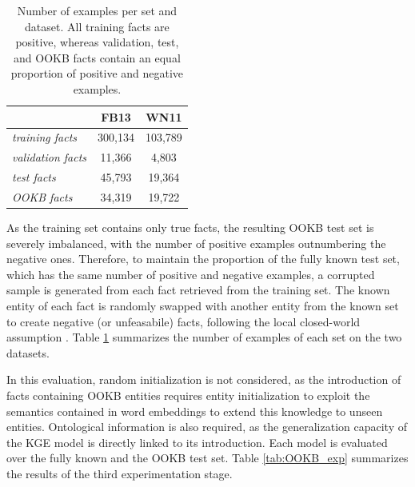\begin{table} 
\centering
\begin{tabular}{l|c|c|}
\cline{2-3}
\textit{}                                       & FB13    & WN11    \\ \hline
\multicolumn{1}{|l|}{\textit{training facts}}   & 300,134 & 103,789 \\ \hline
\multicolumn{1}{|l|}{\textit{validation facts}} & 11,366  & 4,803   \\ \hline
\multicolumn{1}{|l|}{\textit{test facts}}       & 45,793  & 19,364  \\ \hline
\multicolumn{1}{|l|}{\textit{OOKB facts}}      & 34,319  & 19,722  \\ \hline
\end{tabular}
\caption{Number of examples per set and dataset. All training facts are positive, whereas validation, test, and OOKB facts contain an equal proportion of positive and negative examples.}
\label{tab:OOKB_proportions}
\end{table}

As the training set contains only true facts, the resulting OOKB test set is severely imbalanced, with the number of positive examples outnumbering the negative ones. Therefore, to maintain the proportion of the fully known test set, which has the same number of positive and negative examples, a corrupted sample is generated from each fact retrieved from the training set. The known entity of each fact is randomly swapped with another entity from the known set to create negative (or unfeasabile) facts, following the local closed-world assumption \citep{Reiter1978}. Table \ref{tab:OOKB_proportions} summarizes the number of examples of each set on the two datasets.

In this evaluation, random initialization is not considered, as the introduction of facts containing OOKB entities requires entity initialization to exploit the semantics contained in word embeddings to extend this knowledge to unseen entities. Ontological information is also required, as the generalization capacity of the KGE model is directly linked to its introduction. Each model is evaluated over the fully known and the OOKB test set. Table \ref{tab:OOKB_exp} summarizes the results of the third experimentation stage.


